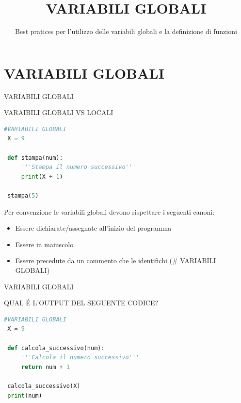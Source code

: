 \documentclass[aspectratio=1610, handout]{beamer}
\title{VARIABILI GLOBALI}
\subtitle{Best pratices per l'utilizzo delle variabili globali e la definizione di funzioni}
\date{}
\institute{\textit{
        Fonti:
        \begin{itemize}
            \item[-] \href{https://docs.python.org/it/3.15/tutorial/controlflow.html}{Definizione di Funzioni - Documentazione Ufficiale Python}
        \end{itemize}
    }
}
\begin{document}
\begin{frame}
    \titlepage
\end{frame}

\section{VARIABILI GLOBALI}

\begin{frame}[fragile]{VARIABILI GLOBALI}
    \begin{alertblock}{VARAIBILI GLOBALI VS LOCALI}
        \begin{minipage}{0.98\linewidth}
\begin{lstlisting}[language=Python]
 #VARIABILI GLOBALI
 X = 9
 
 def stampa(num):
     '''Stampa il numero successivo'''
     print(X + 1)
 
 stampa(5)
\end{lstlisting}
\pause
Per convenzione le variabili globali devono rispettare i seguenti canoni:
\begin{itemize}
    \item Essere dichiarate/assegnate all'inizio del programma
    \item Essere in maiuscolo
    \item Essere precedute da un commento che le identifichi (\# VARIABILI GLOBALI)
\end{itemize}
        \end{minipage}
    \end{alertblock}
\end{frame}

\begin{frame}[fragile]{VARIABILI GLOBALI}
    \begin{alertblock}{QUAL \'E L'OUTPUT DEL SEGUENTE CODICE?}
        \begin{minipage}{0.98\linewidth}
\begin{lstlisting}[language=Python]
 #VARIABILI GLOBALI
 X = 9
 
 def calcola_successivo(num):
     '''Calcola il numero successivo'''
     return num + 1
 
 calcola_successivo(X)
 print(num)
\end{lstlisting}
\pause
{}
        \end{minipage}
    \end{alertblock}
\end{frame}
\end{document}
